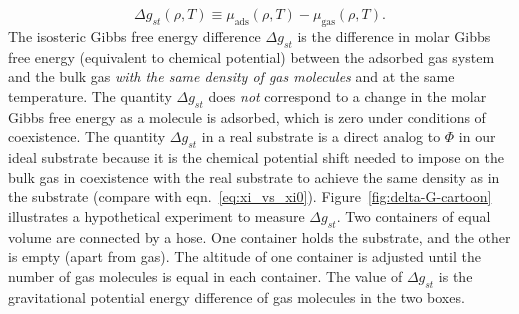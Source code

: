 \documentclass[twoside,twocolumn,9pt]{article}
\newcommand\V{\Phi}
\newcommand\gst{\ensuremath{\Delta g_{st}}}
\newcommand{\blue}[1]{{\bf \color{blue} #1}}
\newcommand{\davidsays}[1]{{\color{red} [\blue{D:} \emph{#1}]}}
\newcommand{\corysays}[1]{{\color{red} [\blue{Cory:} \emph{#1}]}}
\begin{document}
\begin{equation}
   \gst(\rho, T) \equiv
    \mu_{\text{ads}}(\rho, T) - \mu_{\text{gas}}(\rho, T).
  \label{eq:g_st}
\end{equation}
The isosteric Gibbs free energy difference $\gst$ is the difference in molar
Gibbs free energy (equivalent to chemical potential) between the adsorbed gas system and
the bulk gas \emph{with the same density of gas molecules} and at the same temperature. The quantity $\gst$
does \emph{not} correspond to a change in the molar Gibbs free energy as a
molecule is adsorbed, which is zero under conditions of coexistence. The
quantity $\gst$ in a real substrate is a direct analog to $\V$ in our ideal
substrate because it is the chemical potential shift needed to impose on the
bulk gas in coexistence with the real substrate to achieve the same density as
in the substrate (compare with eqn.~\ref{eq:xi_vs_xi0}).
%
%
Figure~\ref{fig:delta-G-cartoon} illustrates a hypothetical experiment to
measure $\gst$.  Two containers of equal volume are connected by a hose.  One
container holds the substrate, and the other is empty (apart from gas).    The
altitude of one container is adjusted until the number of gas molecules is equal
in each container.  The value of $\gst$ is the gravitational potential energy
difference of gas molecules in the two boxes.
\end{document}
